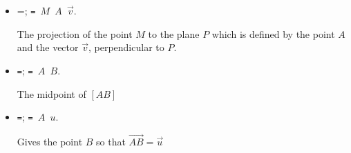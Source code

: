 \begin{itemize}
   {The image of $M$ through consecutive rotations---centered at $O$---and with respective angles
   $\alpha_x$, $\alpha_y$ and $\alpha_z$ around the axes $Ox$,
   $Oy$ and $Oz$.}



\item {}=;
\texttt{= {$M$ $A$ $\vec v$}}.

   {The projection of the point $M$ to the plane $P$ which is defined
   by the point $A$ and the vector $\vec v$, perpendicular to $P$.}

\item \texttt{=};
\texttt{= {$A$ $B$}}.

   {The midpoint of $[AB]$}

\item \texttt{=};
\texttt{= {$A$ $u$}}.

   {Gives the point $B$ so that $\overrightarrow {AB} = \vec u$}

\end{itemize}

\endinput
